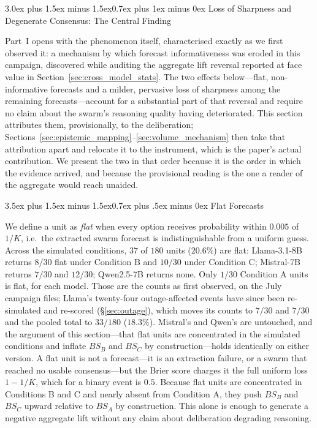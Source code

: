 \documentclass[11pt,journal,onecolumn]{IEEEtran}
\makeatletter
\renewcommand\section{\@startsection{section}{1}{\z@}%
  {3.0ex plus 1.5ex minus 1.5ex}{0.7ex plus 1ex minus 0ex}%
  {\normalfont\normalsize\centering\bfseries}}
\renewcommand\subsection{\@startsection{subsection}{2}{\z@}%
  {3.5ex plus 1.5ex minus 1.5ex}{0.7ex plus .5ex minus 0ex}%
  {\normalfont\normalsize\bfseries}}
\makeatother
\begin{document}
\section{Loss of Sharpness and Degenerate Consensus: The Central Finding}
\label{sec:degenerate}

Part~I opens with the phenomenon itself, characterised exactly as we first observed it: a mechanism by which forecast informativeness was eroded in this campaign, discovered while auditing the aggregate lift reversal reported at face value in Section~\ref{sec:cross_model_stats}. The two effects below---flat, non-informative forecasts and a milder, pervasive loss of sharpness among the remaining forecasts---account for a substantial part of that reversal and require no claim about the swarm's reasoning quality having deteriorated. This section attributes them, provisionally, to the deliberation; Sections~\ref{sec:epistemic_mapping}--\ref{sec:volume_mechanism} then take that attribution apart and relocate it to the instrument, which is the paper's actual contribution. We present the two in that order because it is the order in which the evidence arrived, and because the provisional reading is the one a reader of the aggregate would reach unaided.

\subsection{Flat Forecasts}
\label{sec:degenerate_flat}

We define a unit as \emph{flat} when every option receives probability within $0.005$ of $1/K$, i.e.\ the extracted swarm forecast is indistinguishable from a uniform guess. Across the simulated conditions, $37$ of $180$ units ($20.6\%$) are flat: Llama-3.1-8B returns $8/30$ flat under Condition B and $10/30$ under Condition C; Mistral-7B returns $7/30$ and $12/30$; Qwen2.5-7B returns none. Only $1/30$ Condition A units is flat, for each model. Those are the counts as first observed, on the July campaign files; Llama's twenty-four outage-affected events have since been re-simulated and re-scored (\S\ref{sec:outage}), which moves its counts to $7/30$ and $7/30$ and the pooled total to $33/180$ ($18.3\%$). Mistral's and Qwen's are untouched, and the argument of this section---that flat units are concentrated in the simulated conditions and inflate $BS_B$ and $BS_C$ by construction---holds identically on either version. A flat unit is not a forecast---it is an extraction failure, or a swarm that reached no usable consensus---but the Brier score charges it the full uniform loss $1 - 1/K$, which for a binary event is $0.5$. Because flat units are concentrated in Conditions B and C and nearly absent from Condition A, they push $BS_B$ and $BS_C$ upward relative to $BS_A$ by construction. This alone is enough to generate a negative aggregate lift without any claim about deliberation degrading reasoning.
\end{document}
